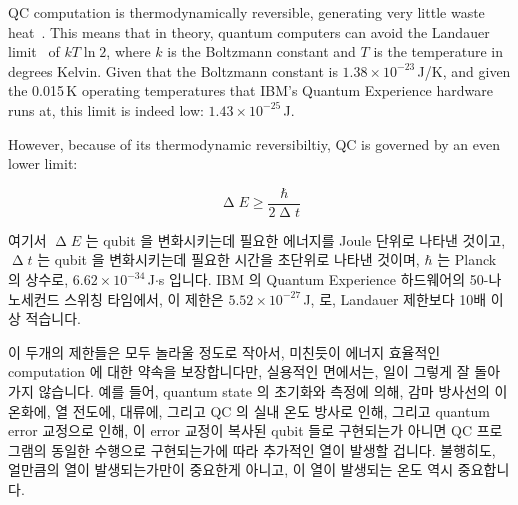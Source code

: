 QC computation is thermodynamically reversible, generating
very little waste heat~\cite{Bennett:1973:LRC:1664562.1664568,RichardFeynman1986QuantumMechanicalComputers}.
This means that in theory, quantum computers can avoid the
Landauer limit~\cite{Landauer:1961:IHG:1661184.1661186}
of $kT \ln 2$, where $k$ is the Boltzmann constant and $T$ is the
temperature in degrees Kelvin.
Given that the Boltzmann constant is $1.38 \times 10^{-23}$\,J/K,
and given the 0.015\,K operating temperatures that IBM's Quantum Experience
hardware runs at, this limit is indeed low: $1.43 \times 10^{-25}$\,J.

However, because of its thermodynamic reversibiltiy,
QC is governed by an even lower limit:
\fi

\begin{equation}
	\upDelta E \geq \frac{\hbar}{2 \upDelta t}
\end{equation}

여기서 $\upDelta E$ 는 qubit 을 변화시키는데 필요한 에너지를 Joule 단위로
나타낸 것이고, $\upDelta t$ 는 qubit 을 변화시키는데 필요한 시간을 초단위로
나타낸
것이며, $\hbar$ 는 Planck 의 상수로, $6.62 \times 10^{-34}$\,J$\cdot$s 입니다.
IBM 의 Quantum Experience 하드웨어의 50-나노세컨드 스위칭 타임에서, 이 제한은
$5.52 \times 10^{-27}$\,J, 로, Landauer 제한보다 10배 이상 적습니다.

이 두개의 제한들은 모두 놀라울 정도로 작아서, 미친듯이 에너지 효율적인
computation 에 대한 약속을 보장합니다만, 실용적인 면에서는, 일이 그렇게 잘
돌아가지 않습니다.
예를 들어, quantum state 의 초기화와 측정에 의해, 감마 방사선의 이온화에, 열
전도에, 대류에, 그리고 QC 의 실내 온도 방사로 인해, 그리고 quantum error
교정으로 인해, 이 error 교정이 복사된 qubit 들로 구현되는가 아니면 QC
프로그램의 동일한 수행으로 구현되는가에 따라 추가적인 열이 발생할 겁니다.
불행히도, 얼만큼의 열이 발생되는가만이 중요한게 아니고, 이 열이 발생되는 온도
역시 중요합니다.

